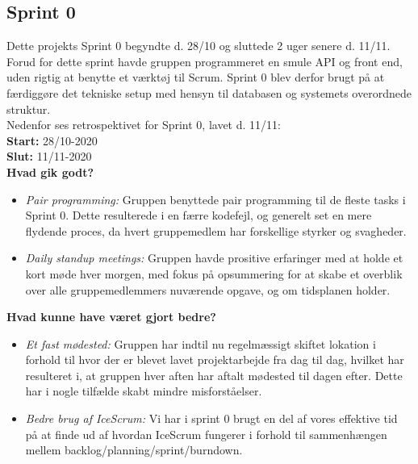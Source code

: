\subsection{Sprint 0}
Dette projekts Sprint 0 begyndte d. 28/10 og sluttede 2 uger senere d. 11/11. Forud for dette sprint havde
gruppen programmeret en smule API og front end, uden rigtig at benytte et værktøj til Scrum. Sprint 0
blev derfor brugt på at færdiggøre det tekniske setup med hensyn til databasen og systemets overordnede struktur. \\
Nedenfor ses retrospektivet for Sprint 0, lavet d. 11/11: \\

\textbf{Start:} 28/10-2020 \\
\textbf{Slut:} 11/11-2020 \\

\textbf{Hvad gik godt?}
\begin{itemize}
    \item \textit{Pair programming:} Gruppen benyttede pair programming til de fleste tasks i Sprint 0. Dette resulterede
    i en færre kodefejl, og generelt set en mere flydende proces, da hvert gruppemedlem har forskellige styrker og svagheder.
    \item \textit{Daily standup meetings:} Gruppen havde prositive erfaringer med at holde et kort møde hver morgen, 
    med fokus på opsummering for at skabe et overblik over alle gruppemedlemmers nuværende opgave, og om tidsplanen holder.
\end{itemize}

\textbf{Hvad kunne have været gjort bedre?}
\begin{itemize}
    \item \textit{Et fast mødested:} Gruppen har indtil nu regelmæssigt skiftet lokation i forhold til hvor der er blevet lavet projektarbejde fra dag til dag, 
    hvilket har resulteret i, at gruppen hver aften har aftalt mødested til dagen efter. Dette har i nogle tilfælde skabt mindre misforståelser.
    \item \textit{Bedre brug af IceScrum:} Vi har i sprint 0 brugt en del af vores effektive tid på at finde ud af hvordan IceScrum fungerer
    i forhold til sammenhængen mellem backlog/planning/sprint/burndown.
\end{itemize}

